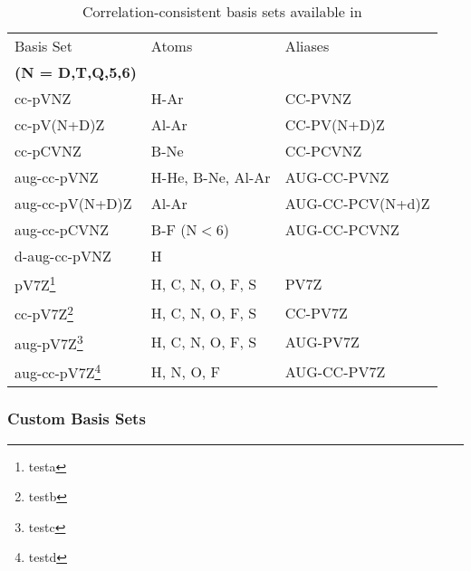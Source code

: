 \begin{table}[tbp]
\caption{Correlation-consistent basis sets available in \PSIthree}
\label{table:ccbasis}
\begin{center}
\begin{tabular}{|l|l|l|}
\hline
\hline
Basis Set 		&Atoms   	&Aliases\\ 
\textbf{ (N = D,T,Q,5,6)}	&			&	\\
\hline
	cc-pVNZ			& H-Ar			&CC-PVNZ\\
	cc-pV(N+D)Z		& Al-Ar			&CC-PV(N+D)Z\\
        cc-pCVNZ                & B-Ne                  &CC-PCVNZ\\
	aug-cc-pVNZ		& H-He, B-Ne, Al-Ar	&AUG-CC-PVNZ\\
	aug-cc-pV(N+D)Z		& Al-Ar			&AUG-CC-PCV(N+d)Z\\
	aug-cc-pCVNZ    	& B-F (N${<}$6)		&AUG-CC-PCVNZ\\
	d-aug-cc-pVNZ		& H			&\\
	pV7Z\footnote{testa}	& H, C, N, O, F, S	&PV7Z\\
	cc-pV7Z\footnote{testb}	& H, C, N, O, F, S	&CC-PV7Z\\
	aug-pV7Z\footnote{testc}     & H, C, N, O, F, S	&AUG-PV7Z\\
	aug-cc-pV7Z\footnote{testd}  & H, N, O, F            &AUG-CC-PV7Z\\
\hline
\hline
\end{tabular}
\end{center}
\end{table}

\subsubsection{Custom Basis Sets} \label{custom-basis}

